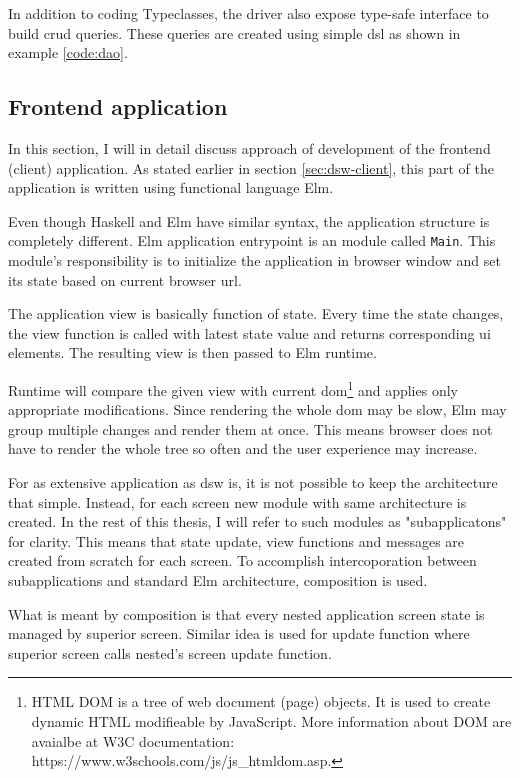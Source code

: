In addition to coding Typeclasses, the driver also expose type-safe interface to build \gls{crud} queries.
These queries are created using simple \gls{dsl} as shown in example \ref{code:dao}.

\subsection{Frontend application}\label{sec:frontend-application}

In this section, I will in detail discuss approach of development of the frontend (client) application.
As stated earlier in section \ref{sec:dsw-client}, this part of the application is written using functional language Elm.

Even though Haskell and Elm have similar syntax, the application structure is completely different.
Elm application entrypoint is an module called \texttt{Main}.
This module's responsibility is to initialize the application in browser window and set its state based on current browser \gls{url}.

The application view is basically function of state.
Every time the state changes, the view function is called with latest state value and returns corresponding \gls{ui} elements.
The resulting view is then passed to Elm runtime.

Runtime will compare the given view with current \gls{dom}\footnote{HTML DOM is a tree of web document (page) objects. It is used to create dynamic HTML modifieable by JavaScript. More information about DOM are avaialbe at W3C documentation: https://www.w3schools.com/js/js\_htmldom.asp.} and applies only appropriate modifications.
Since rendering the whole \gls{dom} may be slow\cite{accelebrate-slow-dom}, Elm may group multiple changes and render them at once.
This means browser does not have to render the whole tree so often and the user experience may increase.

For as extensive application as \gls{dsw} is, it is not possible to keep the architecture that simple.
Instead, for each screen new module with same architecture is created.
In the rest of this thesis, I will refer to such modules as "subapplicatons" for clarity.
This means that state update, view functions and messages are created from scratch for each screen.
To accomplish intercoporation between subapplications and standard Elm architecture, composition is used.

What is meant by composition is that every nested application screen state is managed by superior screen.
Similar idea is used for update function where superior screen calls nested's screen update function.

